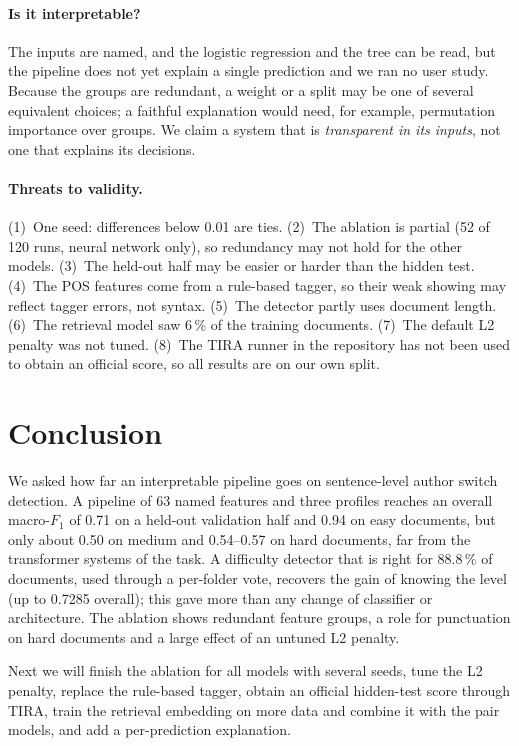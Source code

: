 \documentclass[runningheads]{llncs}
\begin{document}
\paragraph{Is it interpretable?} The inputs are named, and the logistic regression and the tree can be read, but the pipeline does not yet explain a single prediction and we ran no user study. Because the groups are redundant, a weight or a split may be one of several equivalent choices; a faithful explanation would need, for example, permutation importance over groups. We claim a system that is \emph{transparent in its inputs}, not one that explains its decisions.

\paragraph{Threats to validity.} (1)~One seed: differences below 0.01 are ties. (2)~The ablation is partial (52 of 120 runs, neural network only), so redundancy may not hold for the other models. (3)~The held-out half may be easier or harder than the hidden test. (4)~The POS features come from a rule-based tagger, so their weak showing may reflect tagger errors, not syntax. (5)~The detector partly uses document length. (6)~The retrieval model saw 6\,\% of the training documents. (7)~The default L2 penalty was not tuned. (8)~The TIRA runner in the repository has not been used to obtain an official score, so all results are on our own split.

\section{Conclusion}

We asked how far an interpretable pipeline goes on sentence-level author switch detection. A pipeline of 63 named features and three profiles reaches an overall macro-$F_1$ of 0.71 on a held-out validation half and 0.94 on easy documents, but only about 0.50 on medium and 0.54--0.57 on hard documents, far from the transformer systems of the task. A difficulty detector that is right for 88.8\,\% of documents, used through a per-folder vote, recovers the gain of knowing the level (up to 0.7285 overall); this gave more than any change of classifier or architecture. The ablation shows redundant feature groups, a role for punctuation on hard documents and a large effect of an untuned L2 penalty.

Next we will finish the ablation for all models with several seeds, tune the L2 penalty, replace the rule-based tagger, obtain an official hidden-test score through TIRA, train the retrieval embedding on more data and combine it with the pair models, and add a per-prediction explanation.



\end{document}

